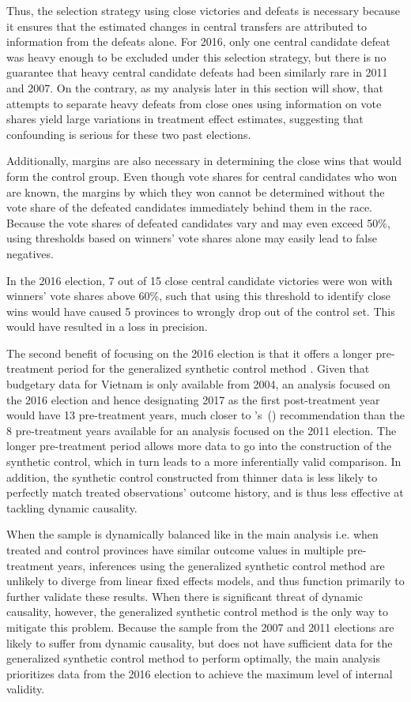 \documentclass[12pt]{article}
\newcommand\citepos[1]{\citeauthor{#1}'s\ (\citeyear{#1})}
\newcommand{\1}{\mathbbm{1}}
\begin{document}
Thus, the selection strategy using close victories and defeats is necessary because it ensures that the estimated changes in central transfers are attributed to information from the defeats alone. For 2016, only one central candidate defeat was heavy enough to be excluded under this selection strategy, but there is no guarantee that heavy central candidate defeats had been similarly rare in 2011 and 2007. On the contrary, as my analysis later in this section will show, that attempts to separate heavy defeats from close ones using information on vote shares yield large variations in treatment effect estimates, suggesting that confounding is serious for these two past elections.

Additionally, margins are also necessary in determining the close wins that would form the control group. Even though vote shares for central candidates who won are known, the margins by which they won cannot be determined without the vote share of the defeated candidates immediately behind them in the race. Because the vote shares of defeated candidates vary and may even exceed 50\%, using thresholds based on winners' vote shares alone may easily lead to false negatives. 

In the 2016 election, 7 out of 15 close central candidate victories were won with winners' vote shares above 60\%, such that using this threshold to identify close wins would have caused 5 provinces to wrongly drop out of the control set. This would have resulted in a loss in precision.

The second benefit of focusing on the 2016 election is that it offers a longer pre-treatment period for the generalized synthetic control method \citep{Xu2017gsynth}. Given that budgetary data for Vietnam is only available from 2004, an analysis focused on the 2016 election and hence designating 2017 as the first post-treatment year would have 13 pre-treatment years, much closer to \citepos{Abadie2010} recommendation than the 8 pre-treatment years available for an analysis focused on the 2011 election. The longer pre-treatment period allows more data to go into the construction of the synthetic control, which in turn leads to a more inferentially valid comparison. In addition, the synthetic control constructed from thinner data is less likely to perfectly match treated observations' outcome history, and is thus less effective at tackling dynamic causality.

When the sample is dynamically balanced like in the main analysis i.e. when treated and control provinces have similar outcome values in multiple pre-treatment years, inferences using the generalized synthetic control method are unlikely to diverge from linear fixed effects models, and thus function primarily to further validate these results. When there is significant threat of dynamic causality, however, the generalized synthetic control method is the only way to mitigate this problem. Because the sample from the 2007 and 2011 elections are likely to suffer from dynamic causality, but does not have sufficient data for the generalized synthetic control method to perform optimally, the main analysis prioritizes data from the 2016 election to achieve the maximum level of internal validity.
\end{document}
